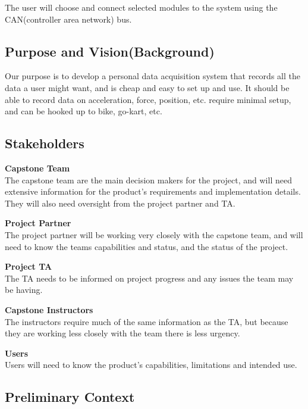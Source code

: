 The user will choose and connect selected modules to the system using
the CAN(controller area network) bus.

\hypertarget{purpose-and-visionbackground}{%
\subsection{Purpose and
Vision(Background)}\label{purpose-and-visionbackground}}

Our purpose is to develop a personal data acquisition system that
records all the data a user might want, and is cheap and easy to set up
and use. It should be able to record data on acceleration, force,
position, etc. require minimal setup, and can be hooked up to bike,
go-kart, etc.

\hypertarget{stakeholders}{%
\subsection{Stakeholders}\label{stakeholders}}

\textbf{Capstone Team}\\
The capstone team are the main decision makers for the project, and will
need extensive information for the product's requirements and
implementation details. They will also need oversight from the project
partner and TA.

\textbf{Project Partner}\\
The project partner will be working very closely with the capstone team,
and will need to know the teams capabilities and status, and the status
of the project.

\textbf{Project TA}\\
The TA needs to be informed on project progress and any issues the team
may be having.

\textbf{Capstone Instructors}\\
The instructors require much of the same information as the TA, but
because they are working less closely with the team there is less
urgency.

\textbf{Users}\\
Users will need to know the product's capabilities, limitations and
intended use.

\hypertarget{preliminary-context}{%
\subsection{Preliminary Context}\label{preliminary-context}}

